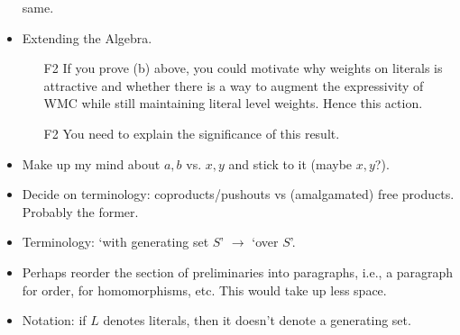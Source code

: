 \documentclass{article}
\theoremstyle{definition}
\theoremstyle{remark}
\begin{document}
\begin{itemize}
  same.
\item Extending the Algebra.
  \begin{itemize}
  \item[F2] If you prove (b) above, you could motivate why weights on literals
    is attractive and whether there is a way to augment the expressivity of WMC
    while still maintaining literal level weights. Hence this action.
  \item[F2] You need to explain the significance of this result.
  \end{itemize}
\item Make up my mind about $a, b$ vs. $x, y$ and stick to it (maybe $x, y$?).
\item Decide on terminology: coproducts/pushouts vs (amalgamated) free products.
  Probably the former.
\item Terminology: `with generating set $S$' $\to$ `over $S$'.
\item Perhaps reorder the section of preliminaries into paragraphs, i.e., a
  paragraph for order, for homomorphisms, etc. This would take up less space.
\item Notation: if $L$ denotes literals, then it doesn't denote a generating
  set.
\end{itemize}
\end{document}
